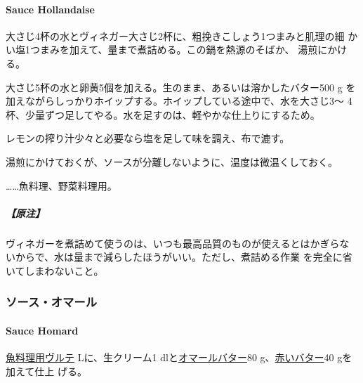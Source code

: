 \begin{recette}
\hypertarget{sauce-hollandaise}{%
\paragraph{Sauce Hollandaise}\label{sauce-hollandaise}}


大さじ4杯の水とヴィネガー大さじ2杯に、粗挽きこしょう1つまみと肌理の細
かい塩1つまみを加えて、\untiers{}量まで煮詰める。この鍋を熱源のそばか、
湯煎にかける。

大さじ5杯の水と卵黄5個を加える。生のまま、あるいは溶かしたバター500 g
を加えながらしっかりホイップする。ホイップしている途中で、水を大さじ3〜
4杯、少量ずつ足してやる。水を足すのは、軽やかな仕上りにするため。

レモンの搾り汁少々と必要なら塩を足して味を調え、布で漉す。

湯煎にかけておくが、ソースが分離しないように、温度は微温くしておく。

\ldots{}\ldots{}魚料理、野菜料理用。

\hypertarget{ux539fux6ce8-9}{%
\subparagraph{【原注】}\label{ux539fux6ce8-9}}

ヴィネガーを煮詰めて使うのは、いつも最高品質のものが使えるとはかぎらな
いからで、水は\untiers{}量まで減らしたほうがいい。ただし、煮詰める作業
を完全に省いてしまわないこと。

\maeaki

\hypertarget{ux30bdux30fcux30b9ux30aaux30deux30fcux30eb}{%
\subsubsection{ソース・オマール}\label{ux30bdux30fcux30b9ux30aaux30deux30fcux30eb}}

\hypertarget{sauce-homard}{%
\paragraph{Sauce Homard}\label{sauce-homard}}


\protect\hyperlink{veloute-de-poisson}{魚料理用ヴルテ}\troisquarts{}
Lに、生クリーム1 \undemi{} dlと\protect\hyperlink{}{オマールバター}80
g、\protect\hyperlink{}{赤いバター}40 gを加えて仕上 げる。


\end{recette}
